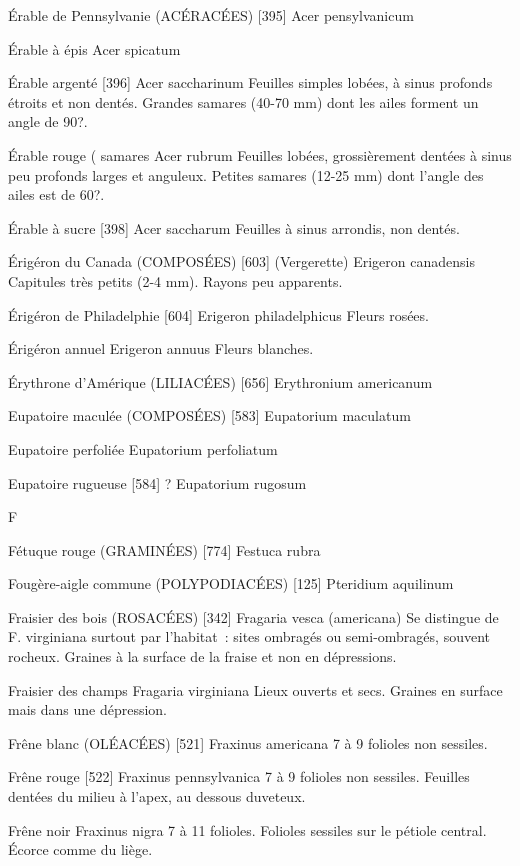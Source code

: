 \documentclass[book,12pt,a4paper,onecolumn,openany]{memoir}
\begin{document}
Érable de Pennsylvanie (ACÉRACÉES)  [395]
				Acer pensylvanicum

Érable à épis
				Acer spicatum

Érable argenté  [396]
				Acer saccharinum
Feuilles simples lobées, à sinus profonds étroits et non dentés.
Grandes samares (40-70 mm) dont les ailes forment un angle de 90?.

Érable rouge							( samares
				Acer rubrum
Feuilles lobées, grossièrement dentées à sinus peu profonds larges et anguleux.
Petites samares (12-25 mm) dont l’angle des ailes est de 60?.

Érable à sucre  [398]
				Acer saccharum
Feuilles à sinus arrondis, non dentés.


Érigéron du Canada (COMPOSÉES)  [603] (Vergerette)
				Erigeron canadensis
Capitules très petits (2-4 mm). Rayons peu apparents.

Érigéron de Philadelphie  [604]
				Erigeron philadelphicus
Fleurs rosées.

Érigéron annuel
				Erigeron annuus
Fleurs blanches.

Érythrone d’Amérique (LILIACÉES)  [656]
				Erythronium americanum

Eupatoire maculée (COMPOSÉES)  [583]
				Eupatorium maculatum

Eupatoire perfoliée
				Eupatorium perfoliatum

Eupatoire rugueuse  [584]							?
				Eupatorium rugosum

F

Fétuque rouge (GRAMINÉES)  [774]
				Festuca rubra

Fougère-aigle commune (POLYPODIACÉES) [125]
				Pteridium aquilinum

Fraisier des bois (ROSACÉES)  [342]
				Fragaria vesca (americana)
Se distingue de F. virginiana surtout par l’habitat : sites ombragés ou semi-ombragés, souvent rocheux. Graines à la surface de la fraise et non en dépressions.

Fraisier des champs
				Fragaria virginiana
Lieux ouverts et secs. Graines en surface mais dans une dépression.

Frêne blanc (OLÉACÉES)  [521]
				Fraxinus americana
7 à 9 folioles non sessiles.



Frêne rouge  [522]
				Fraxinus pennsylvanica
7 à 9 folioles non sessiles. Feuilles dentées du milieu à l’apex, au dessous duveteux.

Frêne noir
				Fraxinus nigra
7 à 11 folioles. Folioles sessiles sur le pétiole central.
Écorce comme du liège.
\end{document}
